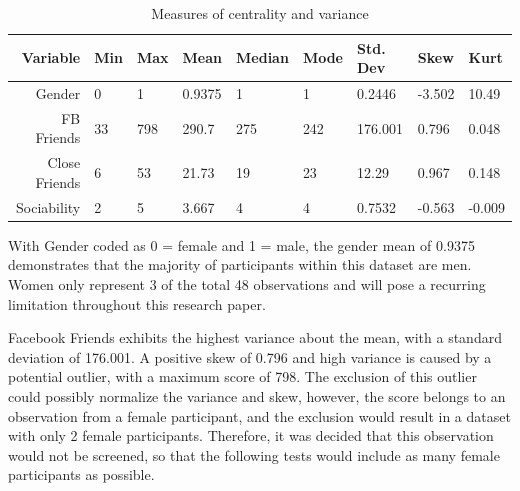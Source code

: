 \begin{table}[H]
\centering
\caption{Measures of centrality and variance}
\begin{tabular}{r|l|l|l|l|l|l|l|l}
Variable      & Min & Max & Mean   & Median & Mode & Std. Dev & Skew   & Kurt      \\ \hline
Gender        & 0   & 1   & 0.9375 & 1      & 1    & 0.2446   & -3.502 & 10.49     \\ \hline
FB Friends    & 33  & 798 & 290.7  & 275    & 242  & 176.001  & 0.796  & 0.048   \\ \hline
Close Friends & 6   & 53  & 21.73  & 19     & 23   & 12.29    & 0.967  & 0.148    \\ \hline
Sociability   & 2   & 5   & 3.667  & 4      & 4    & 0.7532   & -0.563 & -0.009 \\ \hline
\end{tabular}
\end{table}



With Gender coded as 0 = female and 1 = male, the gender mean of 0.9375 demonstrates that the majority of participants within this dataset are men. Women only represent 3 of the total 48 observations and will pose a recurring limitation throughout this research paper.


Facebook Friends exhibits the highest variance about the mean, with a standard deviation of 176.001. A positive skew of 0.796 and high variance is caused by a potential outlier, with a maximum score of 798. The exclusion of this outlier could possibly normalize the variance and skew, however, the score belongs to an observation from a female participant, and the exclusion would result in a dataset with only 2 female participants. Therefore, it was decided that this observation would not be screened, so that the following tests would include as many female participants as possible.


